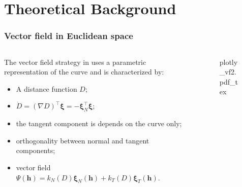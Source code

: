 
\section{Theoretical Background}

\begin{frame}
    \frametitle{Vector field in Euclidean space}
    \begin{columns}[c]
        \begin{column}{7cm}
            The vector field strategy in \citet{Rezende2022} uses a parametric representation of the curve and is characterized by:
            \begin{itemize}
                \item A distance function $D$;
                \item $\dot{D}=(\nabla D)^\top\boldsymbol{\xi}=-\boldsymbol{\xi}_N^\top\boldsymbol{\xi}$;
                \item the tangent component is depends on the curve only;
                \item orthogonality between normal and tangent components;
                \item vector field $\Psi(\mathbf{h})=k_N(D)\boldsymbol{\xi}_N(\mathbf{h}) + k_T(D)\boldsymbol{\xi}_T(\mathbf{h})$.
            \end{itemize}
            
        \end{column}
        \begin{column}{8cm}
           \begin{figure}[ht!]
            \centering
            \def\svgwidth{\linewidth}
            {\footnotesize{plotly_vf2.pdf_tex}}
        \end{figure}
        \end{column}
    \end{columns}
\end{frame}